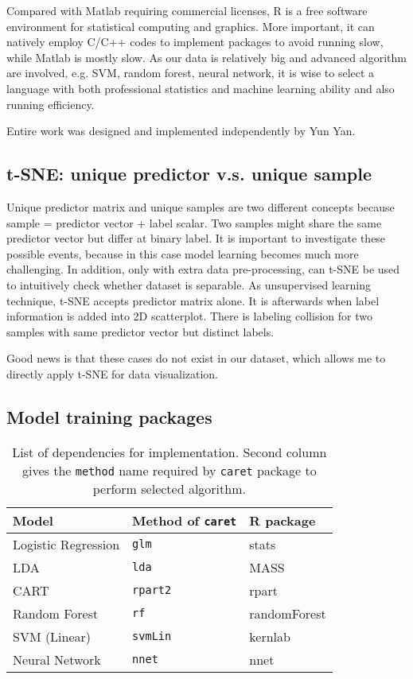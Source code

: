 Compared with Matlab requiring commercial licenses, R is a free software environment for statistical computing and graphics. More important, it can natively employ C/C++ codes to implement packages to avoid running slow, while Matlab is mostly slow. As our data is relatively big and advanced algorithm are involved, e.g. SVM, random forest, neural network, it is wise to select a language with both professional statistics and machine learning ability and also running efficiency. 

Entire work was designed and implemented independently by Yun Yan. 

\subsection{t-SNE: unique predictor v.s. unique sample} 
Unique predictor matrix and unique samples are two different concepts because sample = predictor vector + label scalar. Two samples might share the same predictor vector but differ at binary label. It is important to investigate these possible events, because in this case model learning  becomes much more challenging. In addition, only with extra data pre-processing, can t-SNE \cite{tsne,van2008visualizing} be used to intuitively check whether dataset is separable. As unsupervised learning technique, t-SNE accepts predictor matrix alone. It is afterwards when label information is added into 2D scatterplot. There is labeling collision for two samples with same predictor vector but distinct labels. 

Good news is that these cases do not exist in our dataset, which allows me to directly apply t-SNE for data visualization. 

\subsection{Model training packages}

\begin{table}[hb]
\centering
\begin{tabular}{lll}
\toprule
\textbf{Model} & \textbf{Method of \texttt{caret}} & \textbf{R package} \\
\midrule
Logistic Regression & \texttt{glm} & stats\\
LDA &  \texttt{lda} & MASS\\ 
CART &  \texttt{rpart2} & rpart\\
Random Forest & \texttt{rf} & randomForest\\
SVM (Linear) & \texttt{svmLin} & kernlab\\
Neural Network & \texttt{nnet} & nnet\\
\bottomrule
\end{tabular}
\caption{List of dependencies for implementation. Second column gives the \texttt{method} name required by \texttt{caret} package to perform selected algorithm.}
\label{tab:model-packages}
\end{table}

